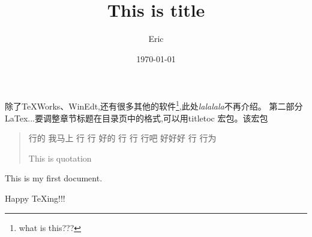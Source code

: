 \documentclass[UTF8]{ctexart}
\title{This is title}
\author{Eric}
\date{\today}
\begin{document}
\maketitle

\tableofcontents
除了TeXWorks、WinEdt,还有很多其他的软件\footnote{what is this???},此处\emph{lalalala}不再介绍。 第二部分 LaTex...要调整章节标题在目录页中的格式,可以用titletoc 宏包。该宏包
\begin{quote}
行的 我马上
行
行
好的
行
行
行吧
好好好
行
行为

This is quotation
\end{quote}



This is my first document.

Happy \TeX ing!!!
\end{document}

